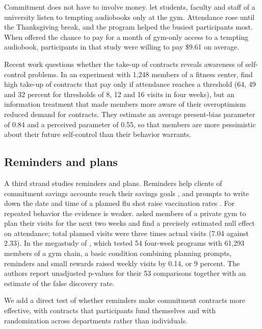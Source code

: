 Commitment does not have to involve money. \citet{milkman2014} let students, faculty and staff of a university listen to tempting audiobooks only at the gym. Attendance rose until the Thanksgiving break, and the program helped the busiest participants most. When offered the chance to pay for a month of gym-only access to a tempting audiobook, participants in that study were willing to pay \$9.61 on average.

Recent work questions whether the take-up of contracts reveals awareness of self-control problems. In an experiment with 1,248 members of a fitness center, \citet{carrera2022} find high take-up of contracts that pay only if attendance reaches a threshold (64, 49 and 32 percent for thresholds of 8, 12 and 16 visits in four weeks), but an information treatment that made members more aware of their overoptimism reduced demand for contracts. They estimate an average present-bias parameter of 0.84 and a perceived parameter of 0.55, so that members are more pessimistic about their future self-control than their behavior warrants.

\subsection{Reminders and plans}
A third strand studies reminders and plans. Reminders help clients of commitment savings accounts reach their savings goals \citep{karlan2016}, and prompts to write down the date and time of a planned flu shot raise vaccination rates \citep{milkman2011}. For repeated behavior the evidence is weaker. \citet{carrera2018plans} asked members of a private gym to plan their visits for the next two weeks and find a precisely estimated null effect on attendance; total planned visits were three times actual visits (7.04 against 2.33). In the megastudy of \citet{milkman2021}, which tested 54 four-week programs with 61,293 members of a gym chain, a basic condition combining planning prompts, reminders and small rewards raised weekly visits by 0.14, or 9 percent. The authors report unadjusted p-values for their 53 comparisons together with an estimate of the false discovery rate.

We add a direct test of whether reminders make commitment contracts more effective, with contracts that participants fund themselves and with randomization across departments rather than individuals.
